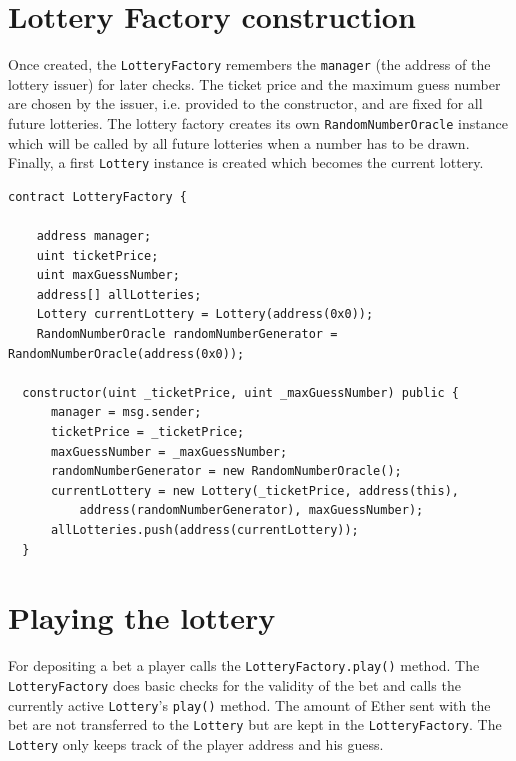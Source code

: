 
\section{Lottery Factory construction}

Once created, the \texttt{LotteryFactory} remembers the \texttt{manager} (the
address of the lottery issuer) for later checks. The ticket price and the
maximum guess number are chosen by the issuer, i.e. provided to the constructor,
and are fixed for all future lotteries. The lottery factory creates its own
\texttt{RandomNumberOracle} instance which will be called by all future lotteries
when a number has to be drawn. Finally, a first \texttt{Lottery} instance is
created which becomes the current lottery.

\begin{Verbatim}[fontsize=\tiny]
contract LotteryFactory {

    address manager;
    uint ticketPrice;
    uint maxGuessNumber;
    address[] allLotteries;
    Lottery currentLottery = Lottery(address(0x0));
    RandomNumberOracle randomNumberGenerator = RandomNumberOracle(address(0x0));

  constructor(uint _ticketPrice, uint _maxGuessNumber) public {
      manager = msg.sender;
      ticketPrice = _ticketPrice;
      maxGuessNumber = _maxGuessNumber;
      randomNumberGenerator = new RandomNumberOracle();
      currentLottery = new Lottery(_ticketPrice, address(this), 
          address(randomNumberGenerator), maxGuessNumber);
      allLotteries.push(address(currentLottery));
  }
\end{Verbatim}


\section{Playing the lottery}

For depositing a bet a player calls the \texttt{LotteryFactory.play()} method.
The \texttt{LotteryFactory} does basic checks for the validity of the bet and
calls the currently active \texttt{Lottery}'s \texttt{play()} method. The amount
of Ether sent with the bet are not transferred to the \texttt{Lottery} but are
kept in the \texttt{LotteryFactory}. The \texttt{Lottery} only keeps track of
the player address and his guess.

